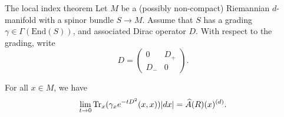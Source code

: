 \documentclass{beamer}
\numberwithin{equation}{section}
\theoremstyle{plain}
\theoremstyle{plain}
\theoremstyle{definition}
\theoremstyle{plain}
\theoremstyle{plain}
\theoremstyle{definition}
\newcommand{\tr}{{\rm Tr}}
\begin{document}
\begin{frame}{The local index theorem}
    Let $M$ be a (possibly non-compact) Riemannian $d$-manifold with a spinor bundle $S\rightarrow M$. Assume that $S$
    has a grading $\gamma\in \Gamma(\mathrm{End}(S))$, and associated Dirac operator $D$. With respect to the grading, write 
    \begin{equation*}
        D = \begin{pmatrix} 0 & D_+\\ D_- & 0 \end{pmatrix}.
    \end{equation*}
    \pause
    \begin{theorem}
        For all $x \in M$, we have
        \begin{equation*}
            \lim_{t\to 0} \tr_x(\gamma_xe^{-tD^2}(x,x))|dx| = \widehat{A}(R)(x)^{(d)}.
        \end{equation*}
    \end{theorem}
\end{frame}
%
%
\end{document}
